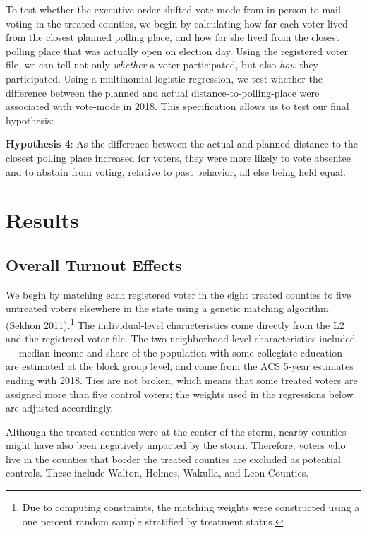 \documentclass[
  12pt,
]{article}
\begin{document}
To test whether the executive order shifted vote mode from in-person to mail voting in the treated counties, we begin by calculating how far each voter lived from the closest planned polling place, and how far she lived from the closest polling place that was actually open on election day. Using the registered voter file, we can tell not only \emph{whether} a voter participated, but also \emph{how} they participated. Using a multinomial logistic regression, we test whether the difference between the planned and actual distance-to-polling-place were associated with vote-mode in 2018. This specification allows us to test our final hypothesis:

\textbf{Hypothesis 4}: As the difference between the actual and planned distance to the closest polling place increased for voters, they were more likely to vote absentee and to abstain from voting, relative to past behavior, all else being held equal.

\hypertarget{results}{%
\section*{Results}\label{results}}

\hypertarget{overall-turnout-effects}{%
\subsection*{Overall Turnout Effects}\label{overall-turnout-effects}}

We begin by matching each registered voter in the eight treated counties to five untreated voters elsewhere in the state using a genetic matching algorithm (Sekhon \protect\hyperlink{ref-Sekhon2011}{2011}).\footnote{Due to computing constraints, the matching weights were constructed using a one percent random sample stratified by treatment status.} The individual-level characteristics come directly from the L2 and the registered voter file. The two neighborhood-level characteristics included --- median income and share of the population with some collegiate education --- are estimated at the block group level, and come from the ACS 5-year estimates ending with 2018. Ties are not broken, which means that some treated voters are assigned more than five control voters; the weights used in the regressions below are adjusted accordingly.

Although the treated counties were at the center of the storm, nearby counties might have also been negatively impacted by the storm. Therefore, voters who live in the counties that border the treated counties are excluded as potential controls. These include Walton, Holmes, Wakulla, and Leon Counties.
\end{document}
